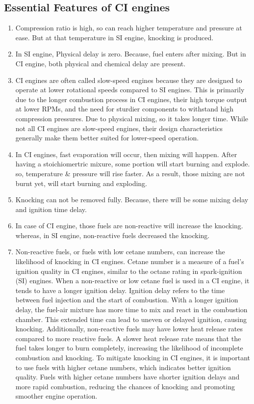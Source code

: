 \documentclass{article}
\begin{document}
\subsection*{Essential Features of CI engines}
\begin{enumerate}
  \item Compression ratio is high, so can reach higher temperature and pressure at ease. But at that temperature in SI engine, knocking is produced. 
  \item In SI engine, Physical delay is zero. Because, fuel enters after mixing. But in CI engine, both physical and chemical delay are present. 
  \item CI engines are often called slow-speed engines because they are designed to operate at lower rotational speeds compared to SI engines. This is primarily due to the longer combustion process in CI engines, their high torque output at lower RPMs, and the need for sturdier components to withstand high compression pressures. Due to physical mixing, so it takes longer time. While not all CI engines are slow-speed engines, their design characteristics generally make them better suited for lower-speed operation. 
  \item In CI engines, fast evaporation will occur, then mixing will happen. After having a stoichiomertric mixure, some portion will start burning and explode. so, temperature \& pressure will rise faster. As a result, those mixing are not burnt yet, will start burning and exploding. 
  \item Knocking can not be removed fully. Because, there will be some mixing delay and ignition time delay. 
  \item In case of CI engine, those fuels are non-reactive will increase the knocking. whereas, in SI engine, non-reactive fuels decreased the knocking. 
  \item Non-reactive fuels, or fuels with low cetane numbers, can increase the likelihood of knocking in CI engines. Cetane number is a measure of a fuel's ignition quality in CI engines, similar to the octane rating in spark-ignition (SI) engines. When a non-reactive or low cetane fuel is used in a CI engine, it tends to have a longer ignition delay. Ignition delay refers to the time between fuel injection and the start of combustion. With a longer ignition delay, the fuel-air mixture has more time to mix and react in the combustion chamber. This extended time can lead to uneven or delayed ignition, causing knocking. Additionally, non-reactive fuels may have lower heat release rates compared to more reactive fuels. A slower heat release rate means that the fuel takes longer to burn completely, increasing the likelihood of incomplete combustion and knocking. To mitigate knocking in CI engines, it is important to use fuels with higher cetane numbers, which indicates better ignition quality. Fuels with higher cetane numbers have shorter ignition delays and more rapid combustion, reducing the chances of knocking and promoting smoother engine operation.

\end{enumerate}
\end{document}

